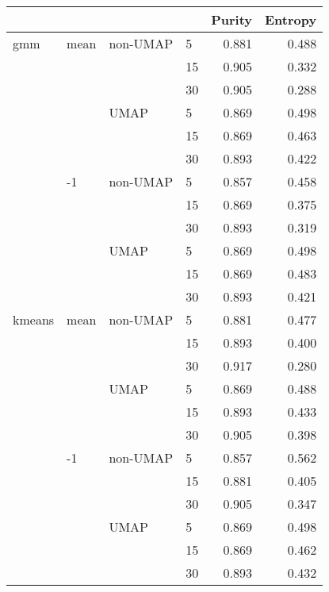 \begin{tabular}{llllrr}
\toprule
       &    &      &    &  Purity &  Entropy \\
\midrule
gmm & mean & non-UMAP & 5  &   0.881 &    0.488 \\
       &    &      & 15 &   0.905 &    0.332 \\
       &    &      & 30 &   0.905 &    0.288 \\
       &    & UMAP & 5  &   0.869 &    0.498 \\
       &    &      & 15 &   0.869 &    0.463 \\
       &    &      & 30 &   0.893 &    0.422 \\
       & -1 & non-UMAP & 5  &   0.857 &    0.458 \\
       &    &      & 15 &   0.869 &    0.375 \\
       &    &      & 30 &   0.893 &    0.319 \\
       &    & UMAP & 5  &   0.869 &    0.498 \\
       &    &      & 15 &   0.869 &    0.483 \\
       &    &      & 30 &   0.893 &    0.421 \\
kmeans & mean & non-UMAP & 5  &   0.881 &    0.477 \\
       &    &      & 15 &   0.893 &    0.400 \\
       &    &      & 30 &   0.917 &    0.280 \\
       &    & UMAP & 5  &   0.869 &    0.488 \\
       &    &      & 15 &   0.893 &    0.433 \\
       &    &      & 30 &   0.905 &    0.398 \\
       & -1 & non-UMAP & 5  &   0.857 &    0.562 \\
       &    &      & 15 &   0.881 &    0.405 \\
       &    &      & 30 &   0.905 &    0.347 \\
       &    & UMAP & 5  &   0.869 &    0.498 \\
       &    &      & 15 &   0.869 &    0.462 \\
       &    &      & 30 &   0.893 &    0.432 \\
\bottomrule
\end{tabular}

